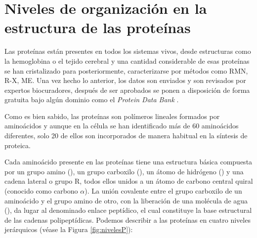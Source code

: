  
 
\section{Niveles de organizaci\'{o}n en la estructura de las prote\'{i}nas}


Las prote\'{i}nas est\'{a}n presentes en todos los sistemas vivos, desde estructuras como la hemoglobina o el tejido cerebral y una cantidad considerable de esas prote\'{i}nas se han cristalizado para
posteriormente, caracterizarse por m\'{e}todos como RMN, R-X, ME. Una vez hecho lo anterior, los datos son enviados y son revisados por expertos biocuradores, despu\'{e}s de
ser aprobados se ponen a disposici\'{o}n de forma gratuita bajo alg\'{u}n dominio como el \textit{Protein Data Bank} \cite{bib:Pdb-bank}.

Como es bien sabido, las prote\'{i}nas son pol\'{i}meros lineales formados por amino\'{a}cidos y aunque en la c\'{e}lula se han identificado m\'{a}s de 60 amino\'{a}cidos diferentes, solo 20 de ellos son incorporados de manera habitual en la s\'{i}ntesis de proteica.

Cada amino\'{a}cido presente en las proteínas tiene una estructura b\'{a}sica compuesta por un grupo amino (), un grupo carboxilo (), un \'{a}tomo de hidr\'{o}geno () y una cadena lateral o grupo R, todos ellos unidos a un \'{a}tomo de carbono central quiral (conocido como carbono $\alpha$). La uni\'{o}n covalente entre el grupo carboxilo de un amino\'{a}cido y el grupo amino de otro, con la liberaci\'{o}n de una mol\'{e}cula de agua (), da lugar al denominado enlace pept\'{i}dico, el cual constituye la base estructural de las cadenas polipept\'{i}dicas. Podemos describir a las prote\'{i}nas en cuatro niveles jer\'{a}rquicos (v\'{e}ase la Figura \ref{fig:nivelesP}):

